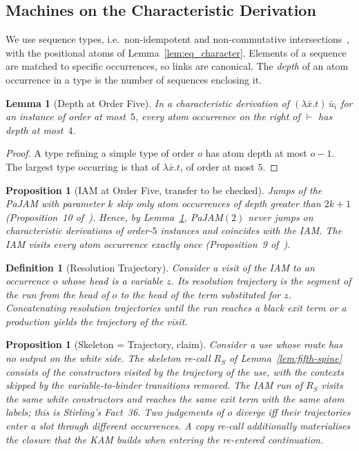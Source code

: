 \documentclass[10pt,a4paper]{article}
\theoremstyle{plain}%
\newtheorem{definition}[theorem]{Definition}
\newtheorem{lemma}[theorem]{Lemma}
\newtheorem{proposition}[theorem]{Proposition}
\begin{document}
\subsection{Machines on the Characteristic Derivation}
\label{sec:fifth-machines}

We use sequence types, i.e.\ non-idempotent and non-commutative intersections~\cite{CatoziDLV26}, with the positional atoms of Lemma~\ref{lem:eq_character}.
Elements of a sequence are matched to specific occurrences, so links are canonical.
The \emph{depth} of an atom occurrence in a type is the number of sequences enclosing it.

\begin{lemma}[Depth at Order Five]\label{lem:fifth-depth}
In a characteristic derivation of $(\lambda\bar x.t)\,\bar u_i$ for an instance of order at most~$5$, every atom occurrence on the right of $\vdash$ has depth at most~$4$.
\end{lemma}

\begin{proof}
A type refining a simple type of order $o$ has atom depth at most $o - 1$.
The largest type occurring is that of $\lambda\bar x.t$, of order at most $5$.
\end{proof}

\begin{proposition}[IAM at Order Five, transfer to be checked]\label{prop:fifth-iam}
Jumps of the PaJAM with parameter $k$ skip only atom occurrences of depth greater than $2k+1$ (Proposition~10 of~\cite{CatoziDLV26}).
Hence, by Lemma~\ref{lem:fifth-depth}, PaJAM$(2)$ never jumps on characteristic derivations of order-$5$ instances and coincides with the IAM.
The IAM visits every atom occurrence exactly once (Proposition~9 of~\cite{CatoziDLV26}).
\end{proposition}

\begin{definition}[Resolution Trajectory]
Consider a visit of the IAM to an occurrence $o$ whose head is a variable $z$.
Its \emph{resolution trajectory} is the segment of the run from the head of $o$ to the head of the term substituted for $z$.
Concatenating resolution trajectories until the run reaches a black exit term or a production yields the \emph{trajectory} of the visit.
\end{definition}

\begin{proposition}[Skeleton = Trajectory, claim]\label{prop:fifth-trajectory}
Consider a use whose route has no output on the white side.
The skeleton re-call $R_S$ of Lemma~\ref{lem:fifth-spine} consists of the constructors visited by the trajectory of the use, with the contexts skipped by the variable-to-binder transitions removed.
The IAM run of $R_S$ visits the same white constructors and reaches the same exit term with the same atom labels; this is Stirling's Fact~36.
Two judgements of $o$ diverge iff their trajectories enter a slot through different occurrences.
A copy re-call additionally materialises the closure that the KAM builds when entering the re-entered continuation.
\end{proposition}
\end{document}
